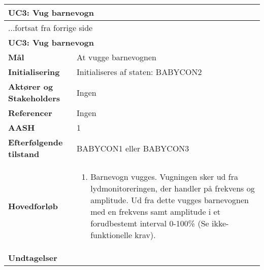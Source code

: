 \begin{center} \centering \label{kravspec:uc3}
	\begin{longtable}{|p{5cm}|p{9cm}|}  %
	\hline
		\multicolumn{2}{|l|}{\textbf{UC3: Vug barnevogn}} \\\hline %
		\endfirsthead
		
		\multicolumn{2}{l}{...fortsat fra forrige side} \\ \hline %
		\multicolumn{2}{|l|}{\textbf{UC3: Vug barnevogn}} \\\hline %
		\endhead	
		
		\textbf{Mål}							&At vugge barnevognen		\\\hline
		\textbf{Initialisering}				&Initialiseres af staten: BABYCON2 \\\hline
		\textbf{Aktører og Stakeholders}		&Ingen		\\\hline 
		\textbf{Referencer}					&Ingen		\\\hline
		\textbf{AASH}						&1		\\\hline
		\textbf{Efterfølgende tilstand}		&BABYCON1 eller BABYCON3	\\\hline
		\textbf{Hovedforløb}					
			&\begin{enumerate}
	
				\item  Barnevogn vugges. Vugningen sker ud fra lydmonitoreringen, der handler på frekvens og amplitude. Ud fra dette vugges barnevognen med en frekvens samt amplitude i et forudbestemt interval 0-100\% (Se ikke-funktionelle krav).
				
				
				
			\end{enumerate}
		\\\hline
		\textbf{Undtagelser}
			

				

		\\\hline
	\end{longtable} 
\end{center}

